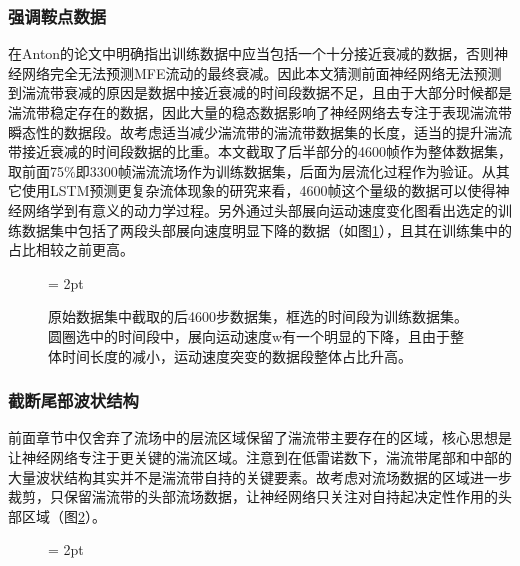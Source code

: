 \subsubsection{强调鞍点数据}
在Anton的论文中明确指出训练数据中应当包括一个十分接近衰减的数据，否则神经网络完全无法预测MFE流动的最终衰减。因此本文猜测前面神经网络无法预测到湍流带衰减的原因是数据中接近衰减的时间段数据不足，且由于大部分时候都是湍流带稳定存在的数据，因此大量的稳态数据影响了神经网络去专注于表现湍流带瞬态性的数据段。故考虑适当减少湍流带的湍流带数据集的长度，适当的提升湍流带接近衰减的时间段数据的比重。本文截取了后半部分的4600帧作为整体数据集，取前面75\%即3300帧湍流流场作为训练数据集，后面为层流化过程作为验证。从其它使用LSTM预测更复杂流体现象的研究来看，4600帧这个量级的数据可以使得神经网络学到有意义的动力学过程。另外通过头部展向运动速度变化图看出选定的训练数据集中包括了两段头部展向速度明显下降的数据（如图\ref{fig:short_speed}），且其在训练集中的占比相较之前更高。
\begin{figure}[H]
	\subfigbottomskip = 2pt
	\begin{minipage}[h]{\linewidth}
	\centering
	\end{minipage}
	\caption{原始数据集中截取的后4600步数据集，框选的时间段为训练数据集。圆圈选中的时间段中，展向运动速度w有一个明显的下降，且由于整体时间长度的减小，运动速度突变的数据段整体占比升高。}
\label{fig:short_speed}
\end{figure}
\subsubsection{截断尾部波状结构}
前面章节中仅舍弃了流场中的层流区域保留了湍流带主要存在的区域，核心思想是让神经网络专注于更关键的湍流区域。注意到在低雷诺数下，湍流带尾部和中部的大量波状结构其实并不是湍流带自持的关键要素。故考虑对流场数据的区域进一步裁剪，只保留湍流带的头部流场数据，让神经网络只关注对自持起决定性作用的头部区域（图\ref{fig:cutcomp}）。
\begin{figure}[H]
	\subfigbottomskip = 2pt
	\begin{minipage}[h]{0.49\linewidth}
	\centering
	\end{minipage}
	\begin{minipage}[h]{0.49\linewidth}
	\centering
	\end{minipage}
	
\label{fig:cutcomp}
\end{figure}
